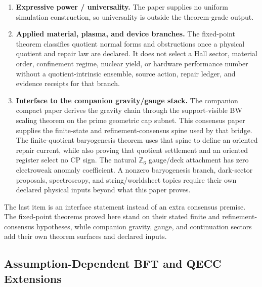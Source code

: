 \documentclass[11pt]{article}
\theoremstyle{remark}
\theoremstyle{plain}
\begin{document}
\begin{enumerate}
\item \textbf{Expressive power / universality.} The paper supplies no uniform simulation construction, so universality is outside the theorem-grade output.

\item \textbf{Applied material, plasma, and device branches.} The fixed-point theorem classifies
quotient normal forms and obstructions once a physical quotient and repair law are declared. It
does not select a Hall sector, material order, confinement regime, nuclear yield, or hardware
performance number without a quotient-intrinsic ensemble, source action, repair ledger, and
evidence receipts for that branch.

\item \textbf{Interface to the companion gravity/gauge stack.} The companion compact paper derives the gravity chain through the support-visible BW scaling theorem on the prime geometric cap subnet. This consensus paper supplies the finite-state and refinement-consensus spine used by that bridge. The finite-quotient baryogenesis theorem uses that spine to define an oriented repair current, while also proving that quotient settlement and an oriented register select no CP sign. The natural \(\mathbb Z_6\) gauge/deck attachment has zero electroweak anomaly coefficient. A nonzero baryogenesis branch, dark-sector proposals, spectroscopy, and string/worldsheet topics require their own declared physical inputs beyond what this paper proves.
\end{enumerate}

The last item is an interface statement instead of an extra consensus premise. The fixed-point
theorems proved here stand on their stated finite and refinement-consensus hypotheses, while
companion gravity, gauge, and continuation sectors add their own theorem surfaces and declared
inputs.

\subsection{Assumption-Dependent BFT and QECC Extensions}
\label{subsec:assumption-dependent-bft-qecc}
\end{document}
